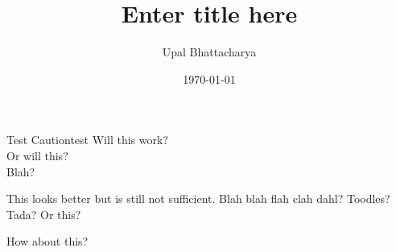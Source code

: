 \documentclass[a4paper]{article}
\author{Upal Bhattacharya}
\date{\today}
\title{Enter title here}
\begin{document}
\maketitle

\linenumbers
\begin{linenomath*}
\begin{caution}{Test Caution}{test}
  Will this work? \\
  Or will this? \\
  Blah?
\end{caution}
\end{linenomath*}

\noindent This looks better but is still not sufficient. Blah blah flah clah dahl? Toodles?
Tada? Or this?

How about this?
\end{document}
